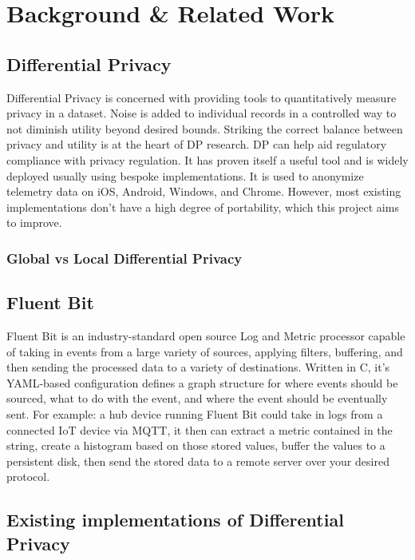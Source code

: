 \chapter{Background \& Related Work\label{chap:background}}

\section{Differential Privacy}

Differential Privacy is concerned with providing tools to quantitatively measure privacy in a dataset. Noise is added to individual records in a controlled way to not diminish utility beyond desired bounds.\cite{WhatisDifferentialPrivacy} Striking the correct balance between privacy and utility is at the heart of DP research.\cite{Dwork2013} DP can help aid regulatory compliance with privacy regulation. It has proven itself a useful tool and is widely deployed usually using bespoke implementations. It is used to anonymize telemetry data on iOS, Android, Windows, and Chrome.\cite{Maranon,markdefalco_2020} However, most existing implementations don't have a high degree of portability, which this project aims to improve.

\subsection{Global vs Local Differential Privacy}

\section{Fluent Bit}
Fluent Bit is an industry-standard open source Log and Metric processor capable of taking in events from a large variety of sources, applying filters, buffering, and then sending the processed data to a variety of destinations.\cite{What-is-Fluent-Bit} Written in C, it's YAML-based configuration defines a graph structure for where events should be sourced, what to do with the event, and where the event should be eventually sent. For example: a hub device running Fluent Bit could take in logs from a connected IoT device via MQTT, it then can extract a metric contained in the string, create a histogram based on those stored values, buffer the values to a persistent disk, then send the stored data to a remote server over your desired protocol.

\section{Existing implementations of Differential Privacy}

